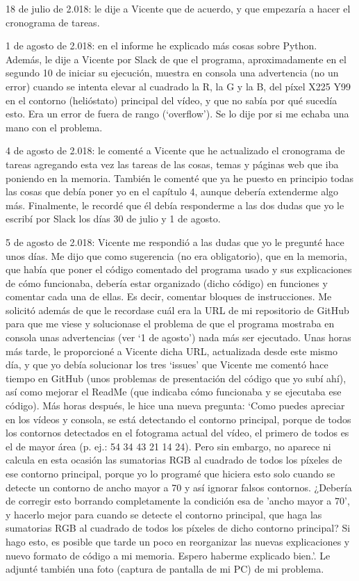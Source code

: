 18 de julio de 2.018: le dije a Vicente que de acuerdo, y que empezaría a hacer el cronograma de tareas.

1 de agosto de 2.018: en el informe he explicado más cosas sobre Python. Además, le dije a Vicente por Slack de que el programa, aproximadamente en el segundo 10 de iniciar su ejecución, muestra en consola una advertencia (no un error) cuando se intenta elevar al cuadrado la R, la G y la B, del píxel X225 Y99 en el contorno (helióstato) principal del vídeo, y que no sabía por qué sucedía esto. Era un error de fuera de rango (‘overflow’). Se lo dije por si me echaba una mano con el problema.

4 de agosto de 2.018: le comenté a Vicente que he actualizado el cronograma de tareas agregando esta vez las tareas de las cosas, temas y páginas web que iba poniendo en la memoria. También le comenté que ya he puesto en principio todas las cosas que debía poner yo en el capítulo 4, aunque debería extenderme algo más. Finalmente, le recordé que él debía responderme a las dos dudas que yo le escribí por Slack los días 30 de julio y 1 de agosto.

5 de agosto de 2.018: Vicente me respondió a las dudas que yo le pregunté hace unos días. Me dijo que como sugerencia (no era obligatorio), que en la memoria, que había que poner el código comentado del programa usado y sus explicaciones de cómo funcionaba, debería estar organizado (dicho código) en funciones y comentar cada una de ellas. Es decir, comentar bloques de instrucciones. Me solicitó además de que le recordase cuál era la URL de mi repositorio de GitHub para que me viese y solucionase el problema de que el programa mostraba en consola unas advertencias (ver ‘1 de agosto’) nada más ser ejecutado. Unas horas más tarde, le proporcioné a Vicente dicha URL, actualizada desde este mismo día, y que yo debía solucionar los tres ‘issues’ que Vicente me comentó hace tiempo en GitHub (unos problemas de presentación del código que yo subí ahí), así como mejorar el ReadMe (que indicaba cómo funcionaba y se ejecutaba ese código). Más horas después, le hice una nueva pregunta: ‘Como puedes apreciar en los vídeos y consola, se está detectando el contorno principal, porque de todos los contornos detectados en el fotograma actual del vídeo, el primero de todos es el de mayor área (p. ej.: 54 34 43 21 14 24). Pero sin embargo, no aparece ni calcula en esta ocasión las sumatorias RGB al cuadrado de todos los píxeles de ese contorno principal, porque yo lo programé que hiciera esto solo cuando se detecte un contorno de ancho mayor a 70 y así ignorar falsos contornos. ¿Debería de corregir esto borrando completamente la condición esa de 'ancho mayor a 70', y hacerlo mejor para cuando se detecte el contorno principal, que haga las sumatorias RGB al cuadrado de todos los píxeles de dicho contorno principal? Si hago esto, es posible que tarde un poco en reorganizar las nuevas explicaciones y nuevo formato de código a mi memoria. Espero haberme explicado bien.’. Le adjunté también una foto (captura de pantalla de mi PC) de mi problema.

